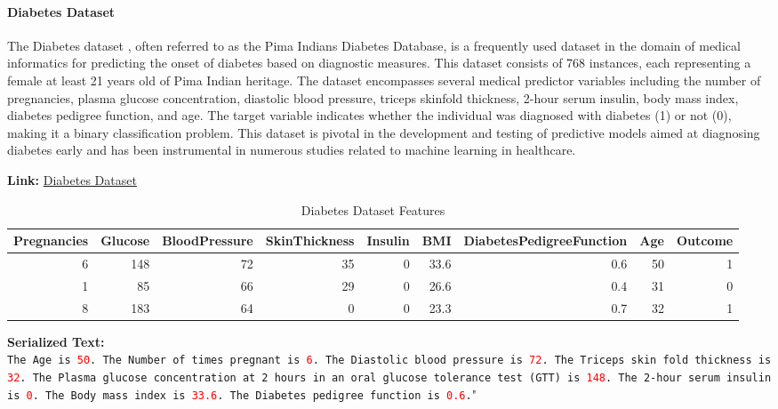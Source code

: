 \documentclass{article}
\theoremstyle{plain}
\theoremstyle{definition}
\theoremstyle{remark}
\begin{document}
\paragraph{Diabetes Dataset} The Diabetes dataset \cite{smith1988using}, often referred to as the Pima Indians Diabetes Database, is a frequently used dataset in the domain of medical informatics for predicting the onset of diabetes based on diagnostic measures. This dataset consists of 768 instances, each representing a female at least 21 years old of Pima Indian heritage. The dataset encompasses several medical predictor variables including the number of pregnancies, plasma glucose concentration, diastolic blood pressure, triceps skinfold thickness, 2-hour serum insulin, body mass index, diabetes pedigree function, and age. The target variable indicates whether the individual was diagnosed with diabetes (1) or not (0), making it a binary classification problem. This dataset is pivotal in the development and testing of predictive models aimed at diagnosing diabetes early and has been instrumental in numerous studies related to machine learning in healthcare.

\textbf{Link: }\href{https://www.kaggle.com/datasets/mathchi/diabetes-data-set}{Diabetes Dataset} 

\begin{table}[h!]
    \centering
    \caption{Diabetes Dataset Features}
\begin{adjustbox}{width=\textwidth}
\begin{tabular}{rrrrrrrrr}
\toprule
 Pregnancies &  Glucose &  BloodPressure &  SkinThickness &  Insulin &  BMI &  DiabetesPedigreeFunction &  Age &  Outcome \\
\midrule
           6 &      148 &             72 &             35 &        0 & 33.6 &                       0.6 &   50 &        1 \\
           1 &       85 &             66 &             29 &        0 & 26.6 &                       0.4 &   31 &        0 \\
           8 &      183 &             64 &              0 &        0 & 23.3 &                       0.7 &   32 &        1 \\
\bottomrule
\end{tabular}
\end{adjustbox}
\end{table}

\begin{mdframed}
\textbf{Serialized Text:}\\
\texttt{The Age is \textcolor{red}{50}. The Number of times pregnant is \textcolor{red}{6}. The Diastolic blood pressure is \textcolor{red}{72}. The Triceps skin fold thickness is \textcolor{red}{32}. The Plasma glucose concentration at 2 hours in an oral glucose tolerance test (GTT) is \textcolor{red}{148}. The 2-hour serum insulin is \textcolor{red}{0}. The Body mass index is \textcolor{red}{33.6}. The Diabetes pedigree function is \textcolor{red}{0.6}.}"
\end{mdframed}
\end{document}
